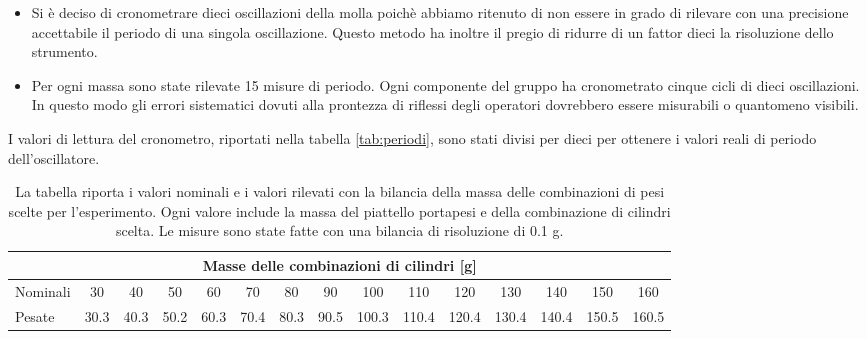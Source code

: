 \begin{itemize}
	\item{Si è deciso di cronometrare dieci oscillazioni della molla
        poichè abbiamo ritenuto di non essere in grado di rilevare con una precisione
        accettabile il periodo di una singola oscillazione. Questo metodo ha inoltre
        il pregio di ridurre di un fattor dieci la risoluzione dello strumento.}

	\item{Per ogni massa sono state rilevate 15 misure di periodo.
        Ogni componente del gruppo ha cronometrato cinque cicli di dieci oscillazioni. 
        In questo modo gli errori sistematici dovuti alla prontezza di riflessi degli
        operatori dovrebbero essere misurabili o quantomeno visibili.}
\end{itemize}

I valori di lettura del cronometro, riportati nella tabella \ref{tab:periodi}, sono stati divisi per dieci per ottenere i valori reali di periodo dell'oscillatore.

\begin{table}
    \centering
    \scriptsize
    \begin{tabular}{l | c c c c c c c c c c c c c c}
        \multicolumn{15}{c}{\small \textbf{Masse delle combinazioni di cilindri [g]}} \\[1mm]
        \toprule
        Nominali & 30 & 40 & 50 & 60 & 70 & 80& 90 & 100 & 110 & 120 & 130 & 140 & 150 & 160 \\
        Pesate & 30.3 & 40.3 & 50.2 & 60.3 & 70.4 & 80.3 & 90.5 & 100.3 & 110.4 & 120.4 & 130.4 & 140.4 & 150.5 & 160.5 \\
        \bottomrule
    \end{tabular}
    \caption{La tabella riporta i valori nominali e i valori rilevati con la bilancia della massa delle combinazioni di pesi scelte per
    l'esperimento. Ogni valore include la massa del piattello portapesi e della combinazione di cilindri scelta. Le misure sono state fatte
    con una bilancia di risoluzione di 0.1 g.}
    \label{tab:masse_dinamico}
\end{table}

